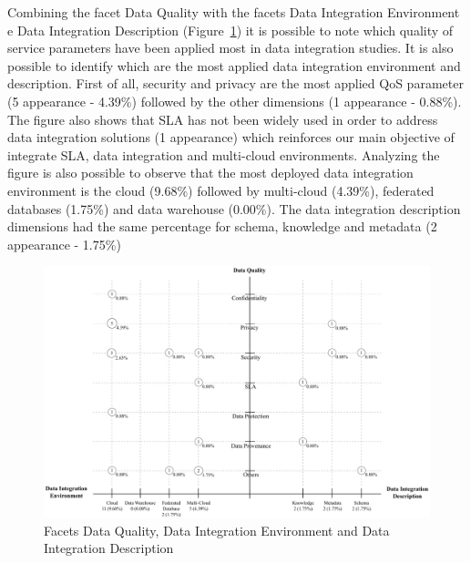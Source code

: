 Combining the facet Data Quality with the facets Data Integration Environment e Data Integration Description
(Figure~\ref{fig:facet4}) it is possible to note which quality of service parameters have been applied most in
data integration studies.
It is also possible to identify which are the most applied data integration environment and description.
First of all, security and privacy are the most applied QoS parameter (5 appearance - 4.39\%)
followed by the other dimensions (1 appearance - 0.88\%). 
The figure also shows that SLA has not been widely used in order to address data integration solutions
(1 appearance) which reinforces our main objective of integrate SLA, data integration and multi-cloud 
environments. 
Analyzing the figure is also possible to observe that the most deployed data integration environment is 
the cloud (9.68\%) followed by multi-cloud (4.39\%), federated databases (1.75\%) and data warehouse (0.00\%).
The data integration description dimensions had the same percentage for schema, knowledge and metadata (2 appearance - 1.75\%)

\begin{figure}[h!]
\centering
\includegraphics[scale=0.53]{figs/bubble-charts/Data-Quality-DI.pdf}
\caption{Facets Data Quality, Data Integration Environment and Data Integration Description}\label{fig:facet4}
\end{figure}
